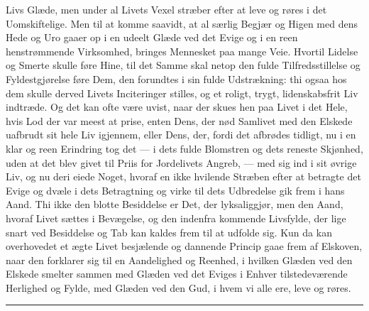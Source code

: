 \documentclass[12pt,a4paper]{book}
\newcommand{\apage}[1]{\marginnote{\footnotesize\textit{[#1]}}}
\begin{document}
Livs Glæde, men under al Livets Vexel stræber efter at leve og røres i
det Uomskiftelige. Men til at komme saavidt, at al særlig Begjær og Higen
med dens Hede og Uro gaaer op i en udeelt Glæde ved det Evige og i en
reen henstrømmende Virksomhed, bringes Mennesket paa mange Veie. Hvortil
Lidelse og Smerte skulle føre Hine, til det Samme skal netop den fulde
Tilfredsstillelse og Fyldestgjørelse føre Dem, den forundtes i sin fulde
Udstrækning: thi ogsaa hos dem skulle derved Livets Inciteringer stilles,
og et roligt, trygt, \apage{173} lidenskabsfrit Liv indtræde. Og det kan ofte være
uvist, naar der skues hen paa Livet i det Hele, hvis Lod der var meest at
prise, enten Dens, der nød Samlivet med den Elskede uafbrudt sit hele Liv
igjennem, eller Dens, der, fordi det afbrødes tidligt, nu i en klar og
reen Erindring tog det --- i dets fulde Blomstren og dets reneste
Skjønhed, uden at det blev givet til Priis for Jordelivets Angreb, --- med
sig ind i sit øvrige Liv, og nu deri eiede Noget, hvoraf en ikke hvilende
Stræben efter at betragte det Evige og dvæle i dets Betragtning og virke
til dets Udbredelse gik frem i hans Aand. Thi ikke den blotte Besiddelse
er Det, der lyksaliggjør, men den Aand, hvoraf Livet sættes i Bevægelse,
og den indenfra kommende Livsfylde, der lige snart ved Besiddelse og Tab
kan kaldes frem til at udfolde sig. Kun da kan overhovedet et ægte Livet
besjælende og dannende Princip gaae frem af Elskoven, naar den forklarer
sig til en Aandelighed og Reenhed, i hvilken Glæden ved den Elskede
smelter sammen med Glæden ved det Eviges i Enhver tilstedeværende
Herlighed og Fylde, med Glæden ved den Gud, i hvem vi alle ere, leve og
røres.

\begin{center}\rule{0.28\linewidth}{0.4pt}\end{center}
\end{document}
